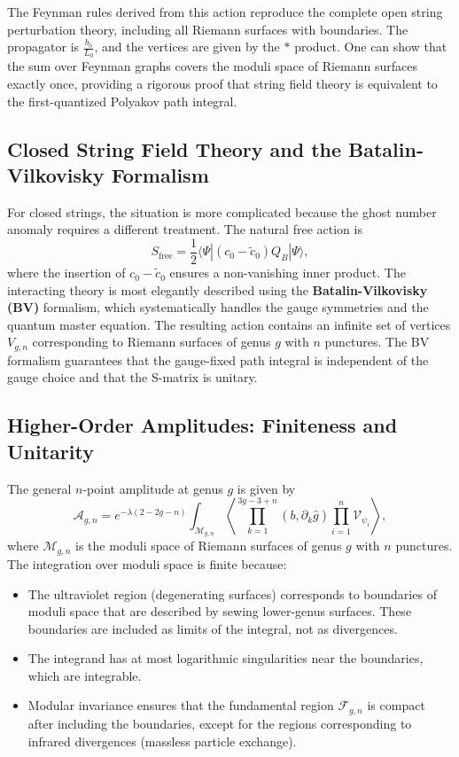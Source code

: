 \documentclass[11pt]{article}
\renewcommand{\tilde}{\widetilde}
\begin{document}
The Feynman rules derived from this action reproduce the complete open string perturbation theory, including all Riemann surfaces with boundaries. The propagator is $\frac{b_0}{L_0}$, and the vertices are given by the $*$ product. One can show that the sum over Feynman graphs covers the moduli space of Riemann surfaces exactly once, providing a rigorous proof that string field theory is equivalent to the first-quantized Polyakov path integral.

\subsection{Closed String Field Theory and the Batalin-Vilkovisky Formalism}

For closed strings, the situation is more complicated because the ghost number anomaly requires a different treatment. The natural free action is
\begin{equation}
S_{\text{free}} = \frac{1}{2} \langle \Psi | (c_0 - \tilde{c}_0) Q_B | \Psi \rangle,
\end{equation}
where the insertion of $c_0 - \tilde{c}_0$ ensures a non-vanishing inner product. The interacting theory is most elegantly described using the \textbf{Batalin-Vilkovisky (BV)} formalism, which systematically handles the gauge symmetries and the quantum master equation. The resulting action contains an infinite set of vertices $V_{g,n}$ corresponding to Riemann surfaces of genus $g$ with $n$ punctures. The BV formalism guarantees that the gauge-fixed path integral is independent of the gauge choice and that the S-matrix is unitary.

\subsection{Higher-Order Amplitudes: Finiteness and Unitarity}

The general $n$-point amplitude at genus $g$ is given by
\begin{equation}
\mathcal{A}_{g,n} = e^{-\lambda (2-2g-n)} \int_{\mathcal{M}_{g,n}} \left\langle \prod_{k=1}^{3g-3+n} (b, \partial_k \hat{g}) \prod_{i=1}^n \mathcal{V}_{\psi_i} \right\rangle,
\end{equation}
where $\mathcal{M}_{g,n}$ is the moduli space of Riemann surfaces of genus $g$ with $n$ punctures. The integration over moduli space is finite because:
\begin{itemize}
\item The ultraviolet region (degenerating surfaces) corresponds to boundaries of moduli space that are described by sewing lower-genus surfaces. These boundaries are included as limits of the integral, not as divergences.
\item The integrand has at most logarithmic singularities near the boundaries, which are integrable.
\item Modular invariance ensures that the fundamental region $\mathcal{F}_{g,n}$ is compact after including the boundaries, except for the regions corresponding to infrared divergences (massless particle exchange).
\end{itemize}
\end{document}

